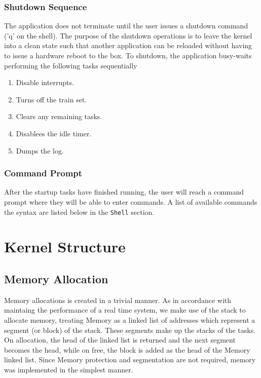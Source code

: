 \documentclass[12pt]{article}
\begin{document}
\subsubsection{Shutdown Sequence}
The application does not terminate until the user issues a shutdown command ('q' on the shell).  The purpose of the shutdown operations is to leave the kernel into a clean state such that another application can be reloaded without having to issue a hardware reboot to the box.  To shutdown, the application busy-waits performing the following tasks sequentially
\begin{enumerate}[label={\bf \arabic*.}, leftmargin=1cm]
  \item Disable interrupts.
  \item Turns off the train set.
  \item Clears any remaining tasks.
  \item Disablees the idle timer.
  \item Dumps the log.
    \\[1\baselineskip]
\end{enumerate}
\subsubsection{Command Prompt}
After the startup tasks have finished running, the user will reach a command prompt where they will be able to enter commands.  A list of available commands the syntax are listed below in the \texttt{Shell} section.
\\[2\baselineskip]

\section{Kernel Structure}
\subsection{Memory Allocation}
Memory allocations is created in a trivial manner.  As in accordance with maintaing the performance of a real time system, we make use of the stack to allocate memory, treating Memory as a linked list of addresses which represent a segment (or block) of the stack.  These segments make up the stacks of the tasks.  On allocation, the head of the linked list is returned and the next segment becomes the head, while on free, the block is added as the head of the Memory linked list.  Since Memory protection and segmentation are not required, memory was implemented in the simplest manner.
\end{document}
